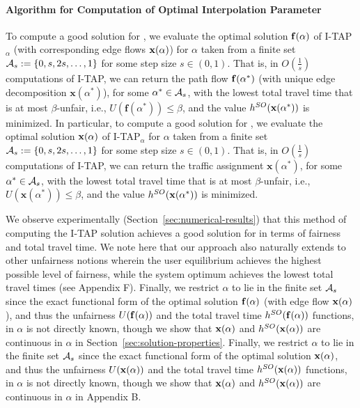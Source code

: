 \documentclass{article}
\newif\ifarxiv   %
\begin{document}
\paragraph{Algorithm for Computation of Optimal Interpolation Parameter} 
To compute a good solution for \fso, we evaluate the optimal solution $\mathbf{f}(\alpha)$ of I-TAP$_\alpha$ (with corresponding edge flows $\mathbf{x}(\alpha)$) for $\alpha$ taken from a finite set $\mathcal{A}_s:=\{0,s,2s,\ldots,1\}$ for some step size $s\in (0,1)$. That is, in $O(\frac{1}{s})$ computations of I-TAP, we can return the path flow $\mathbf{f}(\alpha^*)$ (with unique edge decomposition $\mathbf{x}(\alpha^*)$), for some %
$\alpha^* \in \mathcal{A}_s$, with the lowest total travel time that is at most $\beta$-unfair, i.e., $U(\mathbf{f}(\alpha^*)) \leq \beta$, and the value $h^{SO}(\mathbf{x}(\alpha^*))$ is minimized.
\else
In particular, to compute a good solution for \fso, we evaluate the optimal solution $\mathbf{x}(\alpha)$ of I-TAP$_\alpha$ for $\alpha$ taken from a finite set $\mathcal{A}_s:=\{0,s,2s,\ldots,1\}$ for some step size $s\in (0,1)$. That is, in $O(\frac{1}{s})$ computations of I-TAP, we can return the traffic assignment $\mathbf{x}(\alpha^*)$, for some %
$\alpha^* \in \mathcal{A}_s$, with the lowest total travel time that is at most $\beta$-unfair, i.e.,  $ U(\mathbf{x}(\alpha^*)) \leq \beta$, and the value $h^{SO}(\mathbf{x}(\alpha^*))$ is minimized.
\fi

We observe experimentally (Section~\ref{sec:numerical-results}) that this method of computing the I-TAP solution \ifarxiv for a finite set of convex combination parameters \fi achieves a good solution for \fso in terms of fairness and total travel time. We note here that our approach also naturally extends to other unfairness notions wherein the user equilibrium achieves the highest possible level of fairness, while the system optimum achieves the lowest total travel times (see \ifarxiv Appendix~\ref{apdx:general-unfairness}\else Appendix F\fi). Finally, we restrict $\alpha$ to lie in the finite set $\mathcal{A}_s$ since the exact functional form of the optimal solution $\mathbf{f}(\alpha)$ (with edge flow $\mathbf{x}(\alpha)$), and thus the unfairness $U(\mathbf{f}(\alpha))$ and the total travel time $h^{SO}(\mathbf{f}(\alpha))$ functions, in $\alpha$ is not directly known, though we show that $\mathbf{x}(\alpha)$ and $h^{SO}(\mathbf{x}(\alpha))$ are continuous %
in $\alpha$ in Section~\ref{sec:solution-properties}.
\ifarxiv \else Finally, we restrict $\alpha$ to lie in the finite set $\mathcal{A}_s$ since the exact functional form of the optimal solution $\mathbf{x}(\alpha)$, and thus the unfairness $U(\mathbf{x}(\alpha))$ and the total travel time $h^{SO}(\mathbf{x}(\alpha))$ functions, in $\alpha$ is not directly known, though we show that  $\mathbf{x}(\alpha)$ and $h^{SO}(\mathbf{x}(\alpha))$ are continuous %
in $\alpha$ in Appendix B. 
\end{document}
